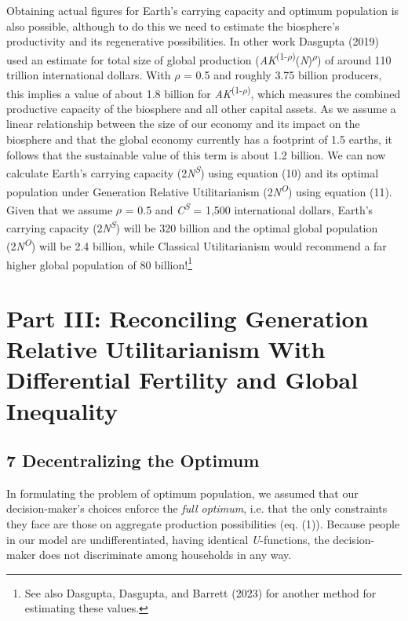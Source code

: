 \documentclass[man,11pt,a4paper,floatsintext]{apa7}
\begin{document}
Obtaining actual figures for Earth's carrying capacity and optimum population is also possible, although to do this we need to estimate the biosphere's productivity and its regenerative possibilities. In other work Dasgupta (2019) used an estimate for total size of global production (\textit{AK}\textsuperscript{(1-$\rho$)}(\textit{N})\textsuperscript{$\rho$}) of around 110 trillion international dollars. With $\rho$ = 0.5 and roughly 3.75 billion producers, this implies a value of about 1.8 billion for \textit{AK}\textsuperscript{(1-$\rho$)}, which measures the combined productive capacity of the biosphere and all other capital assets. As we assume a linear relationship between the size of our economy and its impact on the biosphere and that the global economy currently has a footprint of 1.5 earths, it follows that the sustainable value of this term is about 1.2 billion. We can now calculate Earth's carrying capacity (2\textit{N}\textsuperscript{\textit{S}}) using equation (10) and its optimal population under Generation Relative Utilitarianism (2\textit{N}\textsuperscript{\textit{O}}) using equation (11). Given that we assume $\rho$ = 0.5 and \textit{C}\textsuperscript{\textit{S}} = 1,500 international dollars, Earth's carrying capacity (2\textit{N}\textsuperscript{\textit{S}}) will be 320 billion and the optimal global population (2\textit{N}\textsuperscript{\textit{O}}) will be 2.4 billion, while Classical Utilitarianism would recommend a far higher global population of 80 billion!\footnote{See also Dasgupta, Dasgupta, and Barrett (2023) for another method for estimating these values.}

\section{Part III: Reconciling Generation Relative Utilitarianism With Differential Fertility and Global Inequality}

\subsection{7 Decentralizing the Optimum}

In formulating the problem of optimum population, we assumed that our decision-maker's choices enforce the \textit{full optimum}, i.e. that the only constraints they face are those on aggregate production possibilities (eq. (1)). Because people in our model are undifferentiated, having identical \textit{U}-functions, the decision-maker does not discriminate among households in any way.
\end{document}
